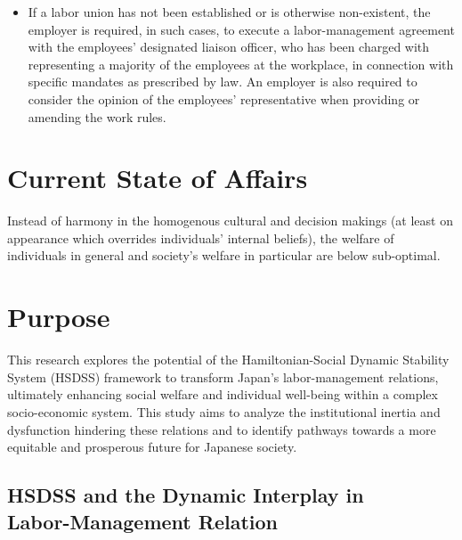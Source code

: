 \documentclass[10pt]{article}
\theoremstyle{definition}
\begin{document}
\begin{itemize}
\begin{itemize}
\begin{itemize}
        \item If a labor union has not been established or is otherwise non-existent, the employer is required, in such cases, to execute a labor-management agreement with the employees' designated liaison officer, who has been charged with representing a majority of the employees at the workplace, in connection with specific mandates as prescribed by law. An employer is also required to consider the opinion of the employees' representative when providing or amending the work rules.
    \end{itemize}
\end{itemize}
\end{itemize}

\section*{Current State of Affairs}
 Instead of harmony in the homogenous cultural and decision makings (at least on appearance which overrides individuals' internal beliefs), the welfare of individuals in general and society's welfare in particular are below sub-optimal.

\section*{Purpose}
This research explores the potential of the Hamiltonian-Social Dynamic Stability System (HSDSS) framework to transform Japan's labor-management relations, ultimately enhancing social welfare and individual well-being within a complex socio-economic system. This study aims to analyze the institutional inertia and dysfunction hindering these relations and to identify pathways towards a more equitable and prosperous future for Japanese society.

\newpage

\begin{center}
\section*{HSDSS and the Dynamic Interplay in\\ Labor-Management Relation}
\end{center}

\section*{}
\end{document}
